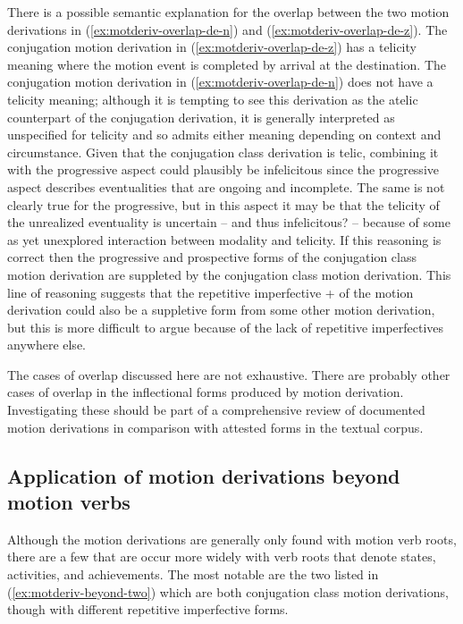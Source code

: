 \documentclass[12pt,letterpaper,oneside,article]{memoir}
\begin{document}
There is a possible semantic explanation for the overlap between the two motion derivations in (\ref{ex:motderiv-overlap-de-n}) and (\ref{ex:motderiv-overlap-de-z}).
The  conjugation motion derivation in (\ref{ex:motderiv-overlap-de-z}) has a telicity meaning where the motion event is completed by arrival at the destination.
The  conjugation motion derivation in (\ref{ex:motderiv-overlap-de-n}) does not have a telicity meaning; although it is tempting to see this derivation as the atelic counterpart of the  conjugation derivation, it is generally interpreted as unspecified for telicity and so admits either meaning depending on context and circumstance.
Given that the  conjugation class derivation is telic, combining it with the progressive aspect could plausibly be infelicitous since the progressive aspect describes eventualities that are ongoing and incomplete.
The same is not clearly true for the progressive, but in this aspect it may be that the telicity of the unrealized eventuality is uncertain – and thus infelicitous? – because of some as yet unexplored interaction between modality and telicity.
If this reasoning is correct then the progressive and prospective forms of the  conjugation class  motion derivation are suppleted by the  conjugation class  motion derivation.
This line of reasoning suggests that the repetitive imperfective  +  of the  motion derivation could also be a suppletive form from some other motion derivation, but this is more difficult to argue because of the lack of  repetitive imperfectives anywhere else. 

The cases of overlap discussed here are not exhaustive.
There are probably other cases of overlap in the inflectional forms produced by motion derivation.
Investigating these should be part of a comprehensive review of documented motion derivations in comparison with attested forms in the textual corpus.

\subsection{Application of motion derivations beyond motion verbs}\label{sec:motderiv-beyond}

Although the motion derivations are generally only found with motion verb roots, there are a few that are occur more widely with verb roots that denote states, activities, and achievements.
The most notable are the two listed in (\ref{ex:motderiv-beyond-two}) which are both  conjugation class motion derivations, though with different repetitive imperfective forms.
\end{document}
